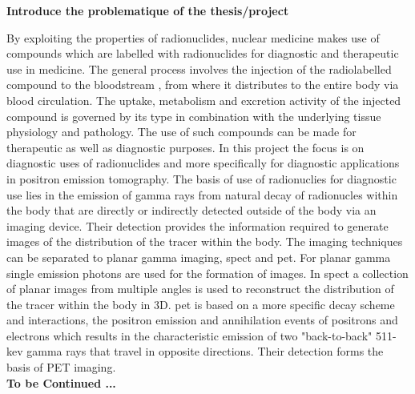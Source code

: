 \textbf{Introduce the problematique of the thesis/project}

By exploiting the properties of radionuclides, nuclear medicine makes use of compounds which are labelled with radionuclides for diagnostic and therapeutic use in medicine. The general process involves the injection of the radiolabelled compound to the bloodstream , from where it distributes to the entire body via blood circulation. The uptake, metabolism and excretion activity of the injected compound is governed by its type in combination with the underlying tissue physiology and pathology. 
The use of such compounds can be made for therapeutic as well as diagnostic purposes. In this project the focus is on diagnostic uses of radionuclides and more specifically for diagnostic applications in positron emission tomography. 
The basis of use of radionuclies for diagnostic use lies in the emission of gamma rays from natural decay of radionucles within the body that are directly or indirectly detected outside of the body via an imaging device. Their detection provides the information required to generate images of the distribution of the tracer within the body. The imaging techniques can be separated to planar gamma imaging, \gls{spect} and \gls{pet}. For planar gamma single emission photons are used for the formation of images. In \gls{spect} a collection of planar images from multiple angles is used to reconstruct the distribution of the tracer within the body in 3D. 
\Gls{pet} is based on a more specific decay scheme and interactions, the positron emission and annihilation events of positrons and electrons which results in the characteristic emission of two "back-to-back" 511-kev gamma rays that travel in opposite directions. Their detection forms the basis of PET imaging. 
\\
\textbf{To be Continued ...}


